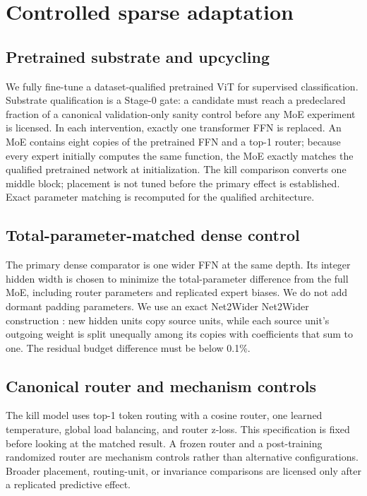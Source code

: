\section{Controlled sparse adaptation}

\subsection{Pretrained substrate and upcycling}
We fully fine-tune a dataset-qualified pretrained ViT for supervised classification. Substrate
qualification is a Stage-0 gate: a candidate must reach a predeclared fraction of a canonical
validation-only sanity control before any MoE experiment is licensed. In each intervention,
exactly one transformer FFN is replaced. An MoE contains eight copies of the pretrained FFN and a
top-1 router; because every expert initially computes the same function, the MoE exactly matches
the qualified pretrained network at initialization. The kill comparison converts one middle
block; placement is not tuned before the primary effect is established. Exact parameter matching
is recomputed for the qualified architecture.

\subsection{Total-parameter-matched dense control}
The primary dense comparator is one wider FFN at the same depth. Its integer hidden width is chosen
to minimize the total-parameter difference from the full MoE, including router parameters and
replicated expert biases. We do not add dormant padding parameters. We use an exact Net2Wider
Net2Wider construction \citep{chen2016net2net}: new hidden units copy source units, while each source unit's outgoing weight is split
unequally among its copies with coefficients that sum to one. The residual budget difference must
be below 0.1\%.

\subsection{Canonical router and mechanism controls}
The kill model uses top-1 token routing with a cosine router, one learned temperature, global load
balancing, and router z-loss. This specification is fixed before looking at the matched result. A
frozen router and a post-training randomized router are mechanism controls rather than alternative
configurations. Broader placement, routing-unit, or invariance comparisons are licensed only after
a replicated predictive effect.
